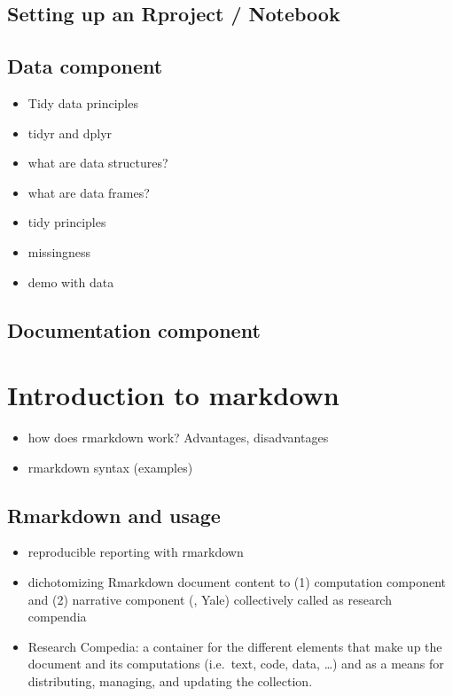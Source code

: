 \documentclass[]{book}
\providecommand{\tightlist}{%
  \setlength{\itemsep}{0pt}\setlength{\parskip}{0pt}}
\begin{document}
\hypertarget{setting-up-an-rproject-notebook}{%
\section{Setting up an Rproject / Notebook}\label{setting-up-an-rproject-notebook}}

\hypertarget{data-component}{%
\section{Data component}\label{data-component}}

\begin{itemize}
\item
  Tidy data principles
\item
  tidyr and dplyr
\item
  what are data structures?
\item
  what are data frames?
\item
  tidy principles
\item
  missingness
\item
  demo with data
\end{itemize}

\hypertarget{documentation-component}{%
\section{Documentation component}\label{documentation-component}}

\hypertarget{introduction-to-markdown}{%
\chapter{Introduction to markdown}\label{introduction-to-markdown}}

\begin{itemize}
\tightlist
\item
  how does rmarkdown work? Advantages, disadvantages
\item
  rmarkdown syntax (examples)
\end{itemize}

\hypertarget{rmarkdown-and-usage}{%
\section{Rmarkdown and usage}\label{rmarkdown-and-usage}}

\begin{itemize}
\item
  reproducible reporting with rmarkdown
\item
  dichotomizing Rmarkdown document content to (1) computation component and (2) narrative component (\citet{MikeKane}, Yale) collectively called as research compendia
\item
  Research Compedia: a container for the different elements that make up the document and its computations (i.e.~text, code, data, \ldots{}) and as a means for distributing, managing, and updating the collection.
\end{itemize}
\end{document}
